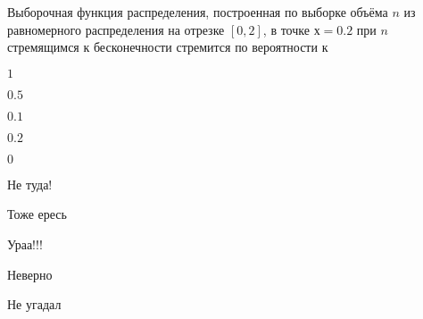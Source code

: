 
\begin{question}
Выборочная функция распределения, построенная по выборке объёма \(n\) из
равномерного распределения на отрезке \([0,2]\), в точке \(х=0.2\) при
\(n\) стремящимся к бесконечности стремится по вероятности к
\begin{answerlist}
  \item \(1\)
  \item \(0.5\)
  \item \(0.1\)
  \item \(0.2\)
  \item \(0\)
\end{answerlist}
\end{question}

\begin{solution}
\begin{answerlist}
  \item Не туда!
  \item Тоже ересь
  \item Ураа!!!
  \item Неверно
  \item Не угадал
\end{answerlist}
\end{solution}

